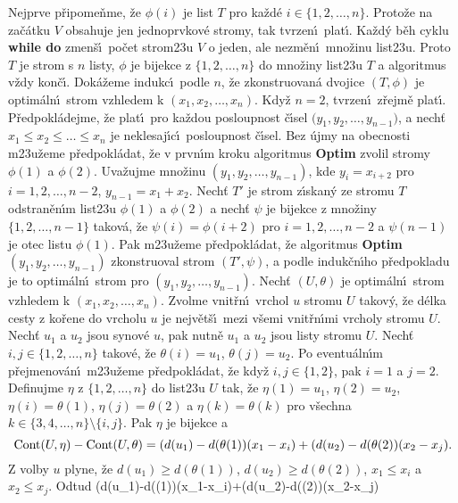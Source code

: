 \flushpar Nejprve p\v ripome\v nme, \v ze $\phi (i)$ je list $T$ 
pro ka\v zd\'e $i\in \{1,2,\dots,n\}$.  Proto\v ze na za\v c\'atku $
V$ 
obsahuje jen 
jednoprvko\-v\'e stromy, tak tvrzen\'\i\ plat\'\i .  Ka\v zd\'y b\v eh cyklu 
{\bf while do} zmen\v s\'\i\ po\v cet strom\accent23u $V$ o jeden, ale nezm\v en\'\i\ 
mno\v zinu list\accent23u.  Proto $T$ je strom s $n$ listy, $\phi$ je 
bijekce z $\{1,2,\dots,n\}$ do mno\v ziny list\accent23u $T$ a algoritmus 
v\v zdy kon\v c\'\i .  Dok\'a\v zeme indukc\'\i\ podle $n$, \v ze zkonstruovan\'a 
dvojice $(T,\phi )$ je optim\'aln\'\i\ strom vzhledem k $(x_1,x_2
,\dots,x_n)$.  
Kdy\v z $n=2$, tvrzen\'\i\ z\v rejm\v e plat\'\i .  P\v redpokl\'adejme, \v ze 
plat\'\i\ pro ka\v zdou posloupnost \v c\'\i sel $(y_1,y_2,\dots,$$
y_{n-1})$, a 
nech\v t $x_1\le x_2\le\dots\le x_n$ je neklesaj\'\i c\'\i\ posloupnost \v c\'\i sel.  Bez \'ujmy na 
obecnosti m\accent23u\v zeme p\v redpokl\'adat, \v ze v prvn\'\i m kroku 
algoritmus {\bf Optim} zvolil stromy $\phi (1)$ a $\phi (2)$.  Uva\v zujme mno\v zinu 
$(y_1,y_2,\dots,y_{n-1})$, kde $y_i=x_{i+2}$ pro $i=1,2,\dots,n-2$, 
$y_{n-1}=x_1+x_2$.  Nech\v t $T'$ je strom z\'\i skan\'y ze stromu $
T$  
odstran\v en\'\i m list\accent23u $\phi (1)$ a $\phi (2)$ a nech\v t $
\psi$ je bijekce z 
mno\v ziny $\{1,2,\dots,n-1\}$ takov\'a, \v ze $\psi (i)=\phi (i+
2)$ pro 
$i=1,2,\dots,n-2$ a $\psi (n-1)$ je otec listu $\phi (1)$.  Pak 
m\accent23u\v zeme p\v redpokl\'adat, \v ze algoritmus 
{\bf Optim$(y_1,y_2,\dots,y_{n-1})$} zkonstruoval strom $(T',\psi 
)$, a podle induk\v cn\'\i ho 
p\v redpokladu je to optim\'aln\'\i\ strom pro $(y_1,y_2,\dots,y_{
n-1})$.  Nech\v t 
$(U,\theta )$ je optim\'aln\'\i\ strom vzhledem k $(x_1,x_2,\dots
,x_n)$.  Zvolme 
vnit\v rn\'\i\ vrchol $u$ stromu $U$ takov\'y, \v ze d\'elka cesty z ko\v rene 
do vrcholu $u$ je nej\-v\v et\v s\'\i\ mezi v\v semi vnit\v rn\'\i mi vrcholy 
stromu $U$.  Nech\v t $u_1$ a $u_2$ jsou synov\'e $u$, pak nutn\v e $
u_1$ 
a $u_2$ jsou listy stromu $U$.  Nech\v t $i,j\in \{1,2,\dots,n\}$ takov\'e, \v ze 
$\theta (i)=u_1$, $\theta (j)=u_2$.  Po eventu\'aln\'\i m p\v rejmenov\'an\'\i\ m\accent23u\v zeme 
p\v redpokl\'adat, \v ze kdy\v z $i,j\in \{1,2\}$, pak $i=1$ a 
$j=2$.  Definujme $\eta$ z $\{1,2,\dots,n\}$ do list\accent23u $U$ tak, \v ze 
$\eta (1)=u_1$, $\eta (2)=u_2$, $\eta (i)=\theta (1)$, $\eta (j)=
\theta (2)$ a $\eta (k)=\theta (k)$ pro 
v\v sechna $k\in \{3,4,\dots,n\}\setminus \{i,j\}$.  Pak $\eta$ je bijekce a 
$$\Cont(U,\eta )-\Cont(U,\theta )=(d(u_1)-d(\theta (1))(x_1-x_i)+
(d(u_2)-d(\theta (2))(x_2-x_j).$$
Z volby $u$ plyne, \v ze $d(u_1)\ge d(\theta (1))$, $d(u_2)\ge d(
\theta (2))$, 
$x_1\le x_i$ a $x_2\le x_j$. Odtud  
$$(d(u_1)-d(\theta (1))(x_1-x_i)+(d(u_2)-d(\theta (2))(x_2-x_j)\le 
